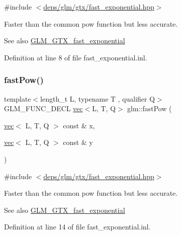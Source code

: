 {\ttfamily \#include $<$\hyperlink{fast__exponential_8hpp}{deps/glm/gtx/fast\+\_\+exponential.\+hpp}$>$}

Faster than the common pow function but less accurate. \begin{DoxySeeAlso}{See also}
\hyperlink{group__gtx__fast__exponential}{G\+L\+M\+\_\+\+G\+T\+X\+\_\+fast\+\_\+exponential} 
\end{DoxySeeAlso}


Definition at line 8 of file fast\+\_\+exponential.\+inl.

\mbox{\label{group__gtx__fast__exponential_ga15325a8ed2d1c4ed2412c4b3b3927aa2}} 
\subsubsection{\texorpdfstring{fast\+Pow()}{fastPow()}\hspace{0.1cm}{\footnotesize\ttfamily [2/4]}}
{\footnotesize\ttfamily template$<$length\+\_\+t L, typename T , qualifier Q$>$ \\
G\+L\+M\+\_\+\+F\+U\+N\+C\+\_\+\+D\+E\+CL \hyperlink{structglm_1_1vec}{vec}$<$L, T, Q$>$ glm\+::fast\+Pow (\begin{DoxyParamCaption}\item[{\hyperlink{structglm_1_1vec}{vec}$<$ L, T, Q $>$ const \&}]{x,  }\item[{\hyperlink{structglm_1_1vec}{vec}$<$ L, T, Q $>$ const \&}]{y }\end{DoxyParamCaption})}



{\ttfamily \#include $<$\hyperlink{fast__exponential_8hpp}{deps/glm/gtx/fast\+\_\+exponential.\+hpp}$>$}

Faster than the common pow function but less accurate. \begin{DoxySeeAlso}{See also}
\hyperlink{group__gtx__fast__exponential}{G\+L\+M\+\_\+\+G\+T\+X\+\_\+fast\+\_\+exponential} 
\end{DoxySeeAlso}


Definition at line 14 of file fast\+\_\+exponential.\+inl.

\mbox{\label{group__gtx__fast__exponential_ga7f2562db9c3e02ae76169c36b086c3f6}} 
